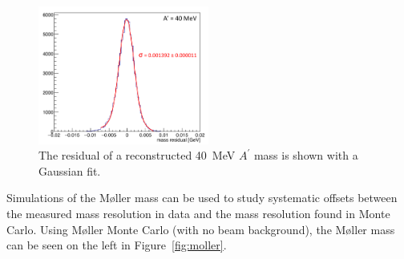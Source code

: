 \begin{figure}[htb]
  \centering
      \includegraphics[width=0.5\textwidth]{pics/searching/ap40mev.png}
  \caption[Fit to the mass residual of a 40~MeV $A^{\prime}$]{The residual of a reconstructed 40~MeV $A^{\prime}$ mass is shown with a Gaussian fit.}
  \label{fig:ap40mev}
\end{figure} 
Simulations of the M\o ller mass can be used to study systematic offsets between the measured mass resolution in data and the mass resolution found in Monte Carlo. Using M\o ller Monte Carlo (with no beam background), the M\o ller mass can be seen on the left in Figure~\ref{fig:moller}. 
